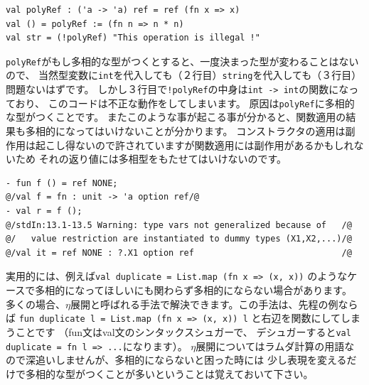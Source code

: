 \documentclass[11pt,a4paper]{article}
\begin{document}
\begin{lstlisting}[caption=値制約が必要なケース(不正なコード、動かない),label=code:need-value-restriction]
val polyRef : ('a -> 'a) ref = ref (fn x => x)
val () = polyRef := (fn n => n * n)
val str = (!polyRef) "This operation is illegal !"
\end{lstlisting}

\lstinline{polyRef}がもし多相的な型がつくとすると、一度決まった型が変わることはないので、
当然型変数に\lstinline{int}を代入しても（２行目）\lstinline{string}を代入しても（３行目）問題ないはずです。
しかし３行目で\lstinline{!polyRef}の中身は\lstinline{int -> int}の関数になっており、
このコードは不正な動作をしてしまいます。
原因は\lstinline{polyRef}に多相的な型がつくことです。
またこのような事が起こる事が分かると、関数適用の結果も多相的になってはいけないことが分かります。
コンストラクタの適用は副作用は起こし得ないので許されていますが関数適用には副作用があるかもしれないため
それの返り値には多相型をもたせてはいけないのです。

\begin{lstlisting}[caption=関数の例,label=code:value-restricted-function]
- fun f () = ref NONE;
@/val f = fn : unit -> 'a option ref/@
- val r = f ();
@/stdIn:13.1-13.5 Warning: type vars not generalized because of   /@
@/   value restriction are instantiated to dummy types (X1,X2,...)/@
@/val it = ref NONE : ?.X1 option ref                             /@
\end{lstlisting}

実用的には、例えば\lstinline{val duplicate = List.map (fn x => (x, x))}
のようなケースで多相的になってほしいにも関わらず多相的にならない場合があります。
多くの場合、$\eta$展開と呼ばれる手法で解決できます。この手法は、先程の例ならば
\lstinline{fun duplicate l = List.map (fn x => (x, x)) l}
と右辺を関数にしてしまうことです
（fun文はval文のシンタックスシュガーで、
デシュガーすると\lstinline{val duplicate = fn l => ...}になります）。
$\eta$展開についてはラムダ計算の用語なので深追いしませんが、多相的にならないと困った時には
少し表現を変えるだけで多相的な型がつくことが多いということは覚えておいて下さい。
\end{document}
